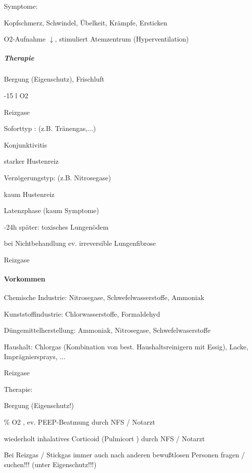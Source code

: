 {\mdseries
Symptome:}

{\mdseries
Kopfschmerz, Schwindel, \"Ubelkeit, Krämpfe, Ersticken}

{\mdseries
O2-Aufnahme ${\downarrow}$, stimuliert Atemzentrum (Hyperventilation)}

\subparagraph*{
Therapie}

{\mdseries
Bergung (Eigenschutz), Frischluft}

{-15 l O2  }

{\mdseries\color[rgb]{0.0,0.0,0.5019608}
Reizgase}

{\mdseries
Soforttyp : (z.B. Tränengas,...)}

{\mdseries
Konjunktivitis}

{\mdseries
starker Hustenreiz}

{\mdseries
Verzögerungstyp: (z.B. Nitrosegase)}

{\mdseries
kaum Hustenreiz}

{\mdseries
Latenzphase (kaum Symptome)}

{-24h später: toxisches Lungenödem}

{\mdseries
bei Nichtbehandlung ev. irreversible Lungenfibrose}

{\mdseries
Reizgase}

\paragraph{Vorkommen}

{\mdseries
Chemische Industrie: Nitrosegase,  Schwefelwasserstoffe, Ammoniak}

{\mdseries
 Kunststoffindustrie: Chlorwasserstoffe,  Formaldehyd}

{\mdseries
D\"ungemittelherstellung: Ammoniak,  Nitrosegase, Schwefelwaserstoffe}

{\mdseries
Haushalt: Chlorgas (Kombination von best.  Haushaltsreinigern mit
Essig), Lacke,  Imprägniersprays, ...}

{\mdseries
Reizgase}

{\mdseries
Therapie:}

{\mdseries
Bergung (Eigenschutz!)}

{\% O2 , ev. PEEP-Beatmung durch NFS /  Notarzt}

{\mdseries
wiederholt inhalatives Corticoid (Pulmicort{\textregistered} )  durch
NFS / Notarzt}

{\mdseries
Bei Reizgas / Stickgas immer auch nach  anderen bewu{\ss}tlosen Personen
fragen /  suchen!!! (unter Eigenschutz!!!)}

\putbib



\clearpage
